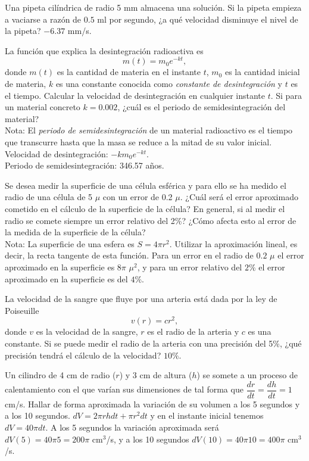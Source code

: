 {Una pipeta cilíndrica de radio 5 mm almacena una solución.
Si la pipeta empieza a vaciarse a razón de $0.5$ ml por segundo, ¿a qué velocidad disminuye el nivel de la pipeta?
}
{$-6.37$ mm/s.
}
{
}


{La función que explica la desintegración radioactiva es
\[
m(t) = m_0e^{-kt},
\]
donde $m(t)$ es la cantidad de materia en el instante $t$, $m_0$ es la cantidad inicial de materia, $k$ es una constante conocida como \emph{constante de desintegración} y $t$ es el tiempo.
Calcular la velocidad de desintegración en cualquier instante $t$. Si para un material concreto $k=0.002$, ¿cuál es el periodo de
semidesintegración del material?\\
Nota: El \emph{periodo de semidesintegración} de un material radioactivo es el tiempo que transcurre hasta que la masa se reduce a la mitad de su valor inicial.
}
{Velocidad de desintegración: $-km_0e^{-kt}$.\\
Periodo de semidesintegración: 346.57 años.
}
{
}


{Se desea medir la superficie de una célula esférica y para ello se ha medido el radio de una célula de 5 $\mu$ con un error de 0.2 $\mu$.
¿Cuál será el error aproximado cometido en el cálculo de la superficie de la célula?
En general, si al medir el radio se comete siempre un error relativo del 2\%? ¿Cómo afecta esto al error de la medida de la superficie
de la célula?\\
Nota: La superficie de una esfera es $S=4\pi r^2$. Utilizar la aproximación lineal, es decir, la recta tangente de esta función.
}
{Para un error en el radio de $0.2$ $\mu$ el error aproximado en la superficie es $8\pi$ $\mu^2$, y para un error relativo del $2\%$
el error aproximado en la superficie es del $4\%$.}
{
}


{La velocidad de la sangre que fluye por una arteria está dada por la ley de Poiseuille
\[
v(r) = cr^2,
\]
donde $v$ es la velocidad de la sangre, $r$ es el radio de la arteria y $c$ es una constante.
Si se puede medir el radio de la arteria con una precisión del 5\%, ¿qué precisión tendrá el cálculo de la velocidad?
}
{$10\%$.
}
{
}


{Un cilindro de 4 cm de radio ($r$) y 3 cm de altura ($h$) se somete a un proceso de calentamiento con el que varían sus dimensiones de tal
forma que $\dfrac{dr}{dt}=\dfrac{dh}{dt}= 1$ cm/s. Hallar de forma aproximada la variación de su volumen a los 5 segundos y a los
10 segundos.
}
{$dV = 2\pi r h dt + \pi r^2 dt$ y en el instante inicial tenemos $dV = 40\pi dt$. A los 5 segundos la variación aproximada será $dV(5) = 40\pi 5 = 200\pi$ cm$^3$/s, y a los 10 segundos $dV(10) = 40\pi 10 = 400\pi$ cm$^3$/s.
}
{
}



